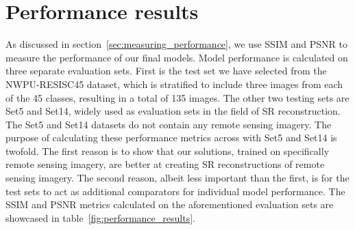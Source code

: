 \section{Performance results}
As discussed in section~\ref{sec:measuring_performance}, we use SSIM and PSNR to measure the performance of our final models. Model performance is calculated on three separate evaluation sets. First is the test set we have selected from the NWPU-RESISC45 dataset, which is stratified to include three images from each of the 45 classes, resulting in a total of 135 images. The other two testing sets are Set5 and Set14, widely used as evaluation sets in the field of SR reconstruction. The Set5 and Set14 datasets do not contain any remote sensing imagery. The purpose of calculating these performance metrics across with Set5 and Set14 is twofold. The first reason is to show that our solutions, trained on specifically remote sensing imagery, are better at creating SR reconstructions of remote sensing imagery. The second reason, albeit less important than the first, is for the test sets to act as additional comparators for individual model performance. The SSIM and PSNR metrics calculated on the aforementioned evaluation sets are showcased in table~\ref{fig:performance_results}.
